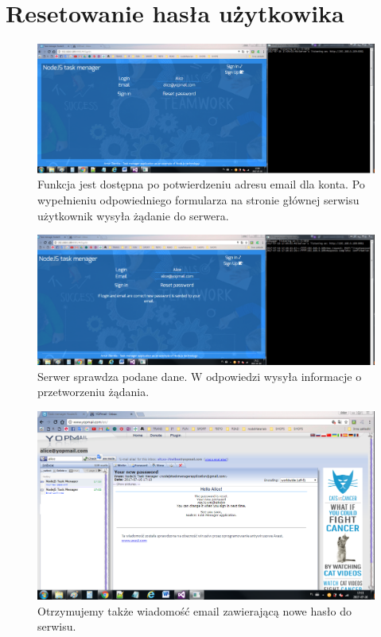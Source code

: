 \documentclass[12pt]{report}
\begin{document}
\section{Resetowanie hasła użytkowika}
\begin{figure}[!hb]
\centering
\includegraphics[width=\textwidth,height=\textheight,keepaspectratio]{51.png}
\captionsetup{labelformat=empty}
\caption[]{Funkcja jest dostępna po potwierdzeniu adresu email dla konta. 
Po wypełnieniu odpowiedniego formularza na stronie głównej serwisu użytkownik wysyła żądanie do serwera.}
\end{figure}
\begin{figure}[!hb]
\centering
\includegraphics[width=\textwidth,height=\textheight,keepaspectratio]{52.png}
\captionsetup{labelformat=empty}
\caption[]{Serwer sprawdza podane dane. W odpowiedzi wysyła informacje o przetworzeniu żądania.}
\end{figure}
\begin{figure}[!hb]
\centering
\includegraphics[width=\textwidth,height=\textheight,keepaspectratio]{53.png}
\captionsetup{labelformat=empty}
\caption[]{Otrzymujemy także wiadomość email zawierającą nowe hasło do serwisu.}
\end{figure}
\end{document}
